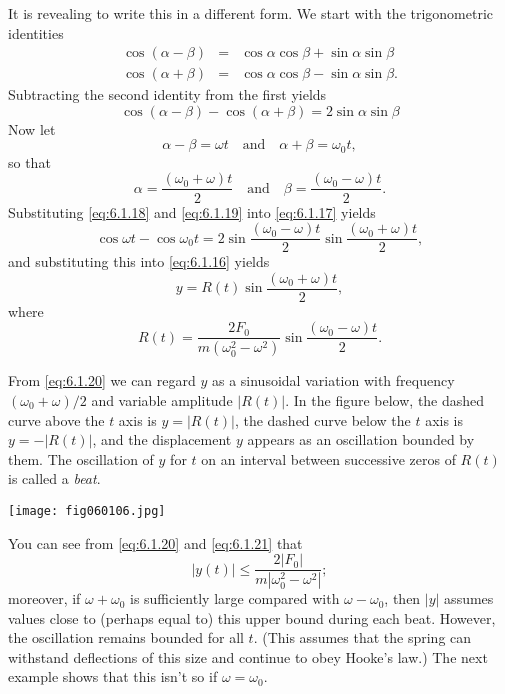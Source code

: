 \documentclass{ximera}
\begin{document}
\begin{example}
\begin{explanation}
It is revealing to write this in a different form.  We start with the
trigonometric identities
\begin{eqnarray*}
\cos(\alpha-\beta)&=&\cos\alpha\cos\beta+\sin\alpha\sin\beta\\
\cos(\alpha+\beta)&=&\cos\alpha\cos\beta-\sin\alpha\sin\beta.
\end{eqnarray*}
Subtracting the second identity from the first yields
\begin{equation}\label{eq:6.1.17}
\cos(\alpha-\beta)-\cos(\alpha+\beta)=2\sin\alpha\sin\beta
\end{equation}
 Now let
\begin{equation}\label{eq:6.1.18}
\alpha-\beta=\omega t\quad\mbox{and}\quad\alpha+\beta=\omega_0t,
\end{equation}
 so that
\begin{equation}\label{eq:6.1.19}
\alpha=\frac{(\omega_0+\omega)t}{2}\quad\mbox{and}\quad\beta=\frac{(\omega_0-\omega
)t}{2}.
\end{equation}
 Substituting \eqref{eq:6.1.18} and \eqref{eq:6.1.19} into \eqref{eq:6.1.17}
yields
 $$
\cos\omega t-\cos\omega_0t=
2\sin\frac{(\omega_0-\omega)t}{2}\sin\frac{(\omega_0+\omega)t}{2},
$$
and substituting this into \eqref{eq:6.1.16} yields
\begin{equation}\label{eq:6.1.20}
y=R(t)\sin\frac{(\omega_0+\omega)t}{2},
\end{equation}
 where
\begin{equation}\label{eq:6.1.21}
R(t)=\frac{2F_0}{m(\omega_0^2-\omega^2)}
\sin\frac{(\omega_0-\omega)t}{2}.
\end{equation}
 
From \eqref{eq:6.1.20} we can regard $y$ as a sinusoidal variation with
frequency $(\omega_0+\omega)/2$ and variable amplitude
$|R(t)|$. In the figure below, the dashed curve above the $t$ axis
is $y=|R(t)|$, the dashed curve below the $t$ axis is $y=-|R(t)|$, and
the displacement $y$ appears as an oscillation bounded by them. The
oscillation of $y$ for $t$ on an interval between successive zeros of
$R(t)$ is called a \textit{beat}.
 
 
 
\begin{image}
  \texttt{[image: fig060106.jpg]}
\end{image}
 
 
 
 
You can see from
\eqref{eq:6.1.20} and \eqref{eq:6.1.21} that
$$
|y(t)|\leq\frac{2|F_0|}{m|\omega_0^2-\omega^2|};
$$
moreover, if $\omega+\omega_0$ is sufficiently large compared with $\omega
-\omega_0$, then $|y|$ assumes values close to (perhaps equal to) this
upper bound during each beat. However, the oscillation remains bounded for
all $t$. (This assumes that the spring can withstand
deflections of this size and continue to obey Hooke's law.)  The next
example shows that this isn't  so if $\omega=\omega_0$.
 
\end{explanation}
\end{example}
 
\end{document}
